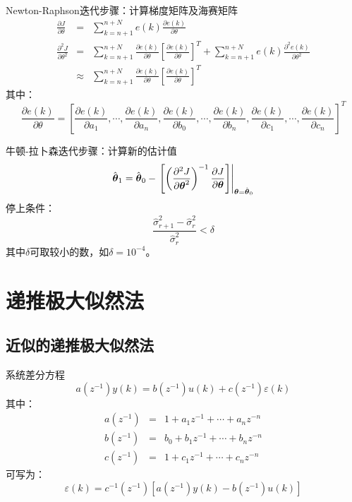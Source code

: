 \begin{frame}{Newton-Raphson迭代步骤：计算梯度矩阵及海赛矩阵}
\begin{eqnarray*}
\frac{\partial J}{\partial\theta} &=& \sum_{k=n+1}^{n+N}e(k)\frac{\partial e(k)}{\partial\theta}  \\
\frac{\partial^2 J}{\partial\theta^2} &=& \sum_{k=n+1}^{n+N}\frac{\partial e(k)}{\partial\theta}\left[\frac{\partial e(k)}{\partial\theta}\right]^T+\sum_{k=n+1}^{n+N}e(k)\frac{\partial^2 e(k)}{\partial\theta^2}  \\
 &\approx& \sum_{k=n+1}^{n+N}\frac{\partial e(k)}{\partial\theta}\left[\frac{\partial e(k)}{\partial\theta}\right]^T
\end{eqnarray*}
其中：
$$
\frac{\partial e(k)}{\partial\theta}=\left[\frac{\partial e(k)}{\partial a_1},\cdots,\frac{\partial e(k)}{\partial a_n},\frac{\partial e(k)}{\partial b_0},\cdots,\frac{\partial e(k)}{\partial b_n},\frac{\partial e(k)}{\partial c_1},\cdots,\frac{\partial e(k)}{\partial c_n}\right]^T
$$
\end{frame}

\begin{frame}{牛顿-拉卜森迭代步骤：计算新的估计值}
$$
\hat{\boldsymbol{\theta}}_1 = \hat{\boldsymbol{\theta}}_0 - \left.\left[ \left(\frac{\partial^2 J}{\partial\boldsymbol{\theta}^2}\right)^{-1}\frac{\partial J}{\partial\boldsymbol{\theta}}\right]\right|_{\boldsymbol{\theta}=\hat{\boldsymbol{\theta}}_0}
$$
停上条件：
$$
\frac{\hat\sigma^2_{r+1}-\hat\sigma^2_r}{\hat\sigma^2_r}< \delta
$$
其中$\delta$可取较小的数，如$\delta=10^{-4}$。
\end{frame}
\section{递推极大似然法}
\subsection{近似的递推极大似然法}
\begin{frame}{系统差分方程}
$$
a(z^{-1})y(k) = b(z^{-1})u(k)+c(z^{-1})\varepsilon(k)
$$
其中：
\begin{eqnarray*}
a(z^{-1}) &=&  1+a_1 z^{-1}+\cdots+a_nz^{-n} \\
b(z^{-1}) &=&  b_0+b_1 z^{-1}+\cdots+b_n z^{-n} \\
c(z^{-1}) &=&  1+c_1 z^{-1}+\cdots+c_n z^{-n} 
\end{eqnarray*}
可写为：
$$
\varepsilon(k) = c^{-1}(z^{-1})[a(z^{-1})y(k)-b(z^{-1})u(k)]
$$
\end{frame}

